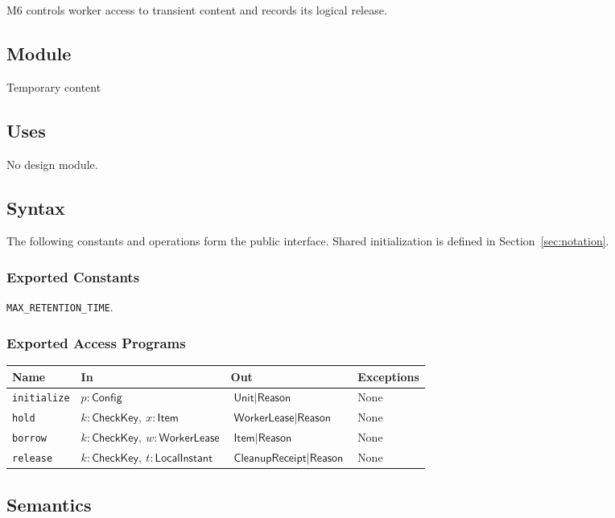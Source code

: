 \documentclass[12pt, titlepage]{article}
\newcommand{\ty}[1]{\textsf{#1}}
\newcommand{\key}{\ty{CheckKey}}
\newcommand{\Const}[1]{\texttt{#1}}
\begin{document}
M6 controls worker access to transient content and records its logical release.

\subsection{Module}

Temporary content

\subsection{Uses}

No design module.

\subsection{Syntax}

The following constants and operations form the public interface. Shared initialization is defined in Section~\ref{sec:notation}.

\subsubsection{Exported Constants}

\Const{MAX\_\allowbreak{}RETENTION\_\allowbreak{}TIME}.

\subsubsection{Exported Access Programs}

\begin{center}
\begin{tabular}{p{3.3cm} p{4cm} p{4cm} p{2.4cm}}
\hline
\textbf{Name} & \textbf{In} & \textbf{Out} & \textbf{Exceptions} \\
\hline
\texttt{initialize} & $p:\ty{Config}$ & $\ty{Unit}\mid\ty{Reason}$ & None \\
\texttt{hold} & $k:\key,\ x:\ty{Item}$ & $\ty{WorkerLease}\mid\ty{Reason}$ & None \\
\texttt{borrow} & $k:\key,\ w:\ty{WorkerLease}$ & $\ty{Item}\mid\ty{Reason}$ & None \\
\texttt{release} & $k:\key,\ t:\ty{LocalInstant}$ & $\ty{CleanupReceipt}\mid\ty{Reason}$ & None \\
\hline
\end{tabular}
\end{center}

\subsection{Semantics}
\end{document}
